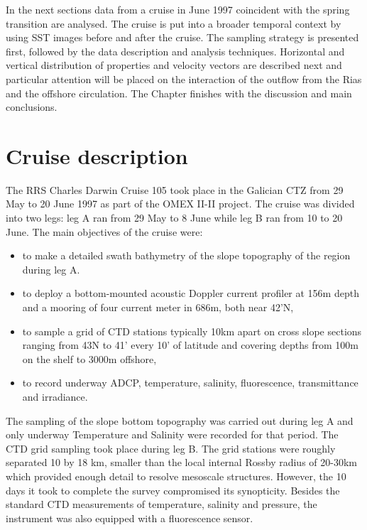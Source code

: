 In the next sections data from a cruise in June 1997 coincident
with the spring transition are analysed. The cruise is put into a
broader temporal context by using SST images before and after the
cruise. The sampling strategy is presented first, followed by the
data description and analysis techniques.  Horizontal and vertical
distribution of properties and velocity vectors are described next
and particular attention will be placed on the interaction of the
outflow from the Rias and the offshore circulation. The Chapter
finishes with the discussion and main conclusions.

\section{Cruise description}
The RRS Charles Darwin Cruise 105 took place in the Galician CTZ
from 29 May to 20 June 1997 as part of the OMEX II-II project. The
cruise was divided into two legs: leg A ran from 29 May to 8 June
while leg B ran from 10 to 20 June. The main objectives of the
cruise were:

\begin{itemize}
  \item  to make a detailed swath bathymetry of the slope topography of the
  region during leg A.
  \item  to deploy a
bottom-mounted acoustic Doppler current profiler at 156m depth and
a mooring of four current meter in 686m, both near 42'N,
  \item to sample a grid of CTD stations typically 10km apart on
  cross slope sections ranging from 43\deg N to 41' every 10' of latitude
  and covering depths from 100m on the shelf to 3000m offshore,
  \item to record underway ADCP, temperature, salinity,
  fluorescence, transmittance and irradiance.
\end{itemize}
The sampling of the slope bottom topography was carried out during
leg A and only underway Temperature and Salinity were recorded for
that period. The CTD grid sampling took place during leg B. The
grid stations were roughly separated 10 by 18 km, smaller than the
local internal Rossby radius of 20-30km \citep{Chelton98} which
provided enough detail to resolve mesoscale structures. However,
the 10 days it took to complete the survey compromised its
synopticity. Besides the standard CTD measurements of temperature,
salinity and pressure, the instrument was also equipped with a
fluorescence sensor.

